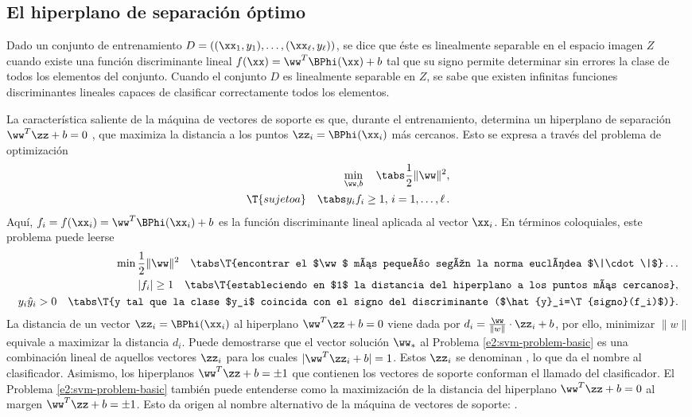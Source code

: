 %
%
\subsection{El hiperplano de separación óptimo}
%
Dado un conjunto de entrenamiento
$D=\left((\xx_1,y_1),\ldots,(\xx_\ell,y_\ell)\right)$, se dice que
éste es linealmente separable en el espacio imagen $Z$ cuando existe
una función discriminante lineal $f(\xx)=\ww^T\BPhi(\xx)+b$ tal que su
signo permite determinar sin errores la clase de todos los elementos
del conjunto. Cuando el conjunto $D$ es linealmente separable en $Z$,
se sabe que existen infinitas funciones discriminantes lineales
capaces de clasificar correctamente todos los elementos.

La característica saliente de la máquina de vectores de soporte es
que, durante el entrenamiento, determina un hiperplano de separación
$\ww^T\zz+b=0$ , que maximiza la distancia a los puntos
$\zz_i=\BPhi(\xx_i)$ más cercanos. Esto se expresa a través del
problema de optimización
%
\begin{align}
  \label{e2:svm-problem-basic}
  \begin{split}
    \min_{\ww,b} \quad\tabs \frac{1}{2}\|\ww\|^2, \\
    \T{sujeto a}\quad\tabs y_i f_i\geq1,\,i=1,\ldots,\ell\,.
  \end{split}
\end{align}
%
Aquí, $f_i=f(\xx_i)=\ww^T\BPhi(\xx_i)+b$ es la función discriminante
lineal aplicada al vector $\xx_i$. En términos coloquiales, este
problema puede leerse
%
\begin{align*}
  \begin{split}
    \min \frac{1}{2}\|\ww\|^2 \quad \tabs \T{encontrar el $\ww$ más
      pequeño según la norma euclídea $\|\cdot\|$}\ldots\\
    |f_i|\geq1 \quad \tabs \T{estableciendo en $1$ la distancia del
      hiperplano a los puntos más cercanos},\\
    y_i\hat{y}_i>0\quad \tabs \T{y tal que la clase $y_i$ coincida con el
      signo del discriminante ($\hat{y}_i=\T{signo}(f_i)$)}.
  \end{split}
\end{align*}
%
La distancia de un vector $\zz_i=\BPhi(\xx_i)$ al hiperplano
$\ww^T\zz+b=0$ viene dada por $d_i=\frac{\ww}{\|w\|}\cdot\zz_i+b$, por
ello, minimizar $\|w\|$ equivale a maximizar la distancia $d_i$.
Puede demostrarse que el vector solución $\ww_*$ al Problema
\ref{e2:svm-problem-basic} es una combinación lineal de aquellos
vectores $\zz_i$ para los cuales $|\ww^T\zz_i+b|=1$. Estos $\zz_i$ se
denominan , lo que da el nombre al
clasificador.  Asimismo, los hiperplanos $\ww^T\zz+b=\pm1$ que
contienen los vectores de soporte conforman el llamado  del
clasificador. El Problema \ref{e2:svm-problem-basic} también puede
entenderse como la maximización de la distancia del hiperplano
$\ww^T\zz+b=0$ al margen $\ww^T\zz+b=\pm1$. Esto da origen al nombre
alternativo de la máquina de vectores de soporte: .

